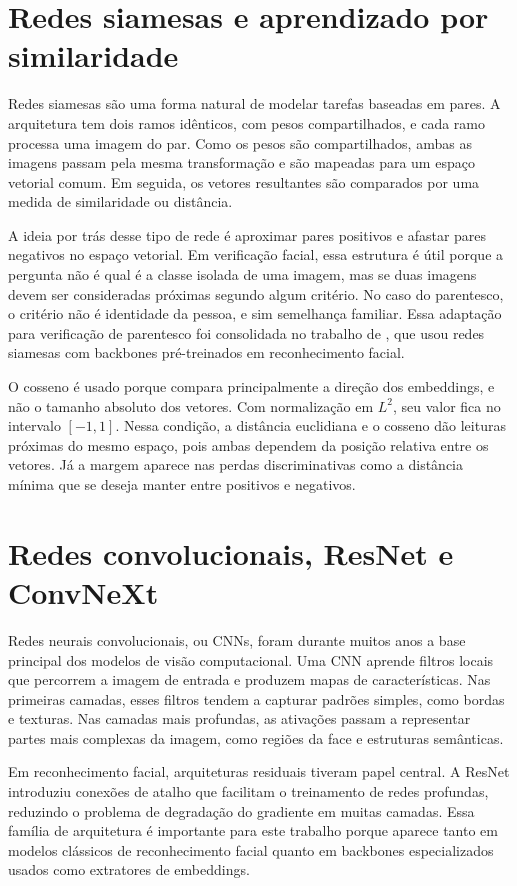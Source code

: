 \section{Redes siamesas e aprendizado por similaridade}

Redes siamesas são uma forma natural de modelar tarefas baseadas em pares. A arquitetura tem dois ramos idênticos, com pesos compartilhados, e cada ramo processa uma imagem do par. Como os pesos são compartilhados, ambas as imagens passam pela mesma transformação e são mapeadas para um espaço vetorial comum. Em seguida, os vetores resultantes são comparados por uma medida de similaridade ou distância.

A ideia por trás desse tipo de rede é aproximar pares positivos e afastar pares negativos no espaço vetorial. Em verificação facial, essa estrutura é útil porque a pergunta não é qual é a classe isolada de uma imagem, mas se duas imagens devem ser consideradas próximas segundo algum critério. No caso do parentesco, o critério não é identidade da pessoa, e sim semelhança familiar. Essa adaptação para verificação de parentesco foi consolidada no trabalho de , que usou redes siamesas com backbones pré-treinados em reconhecimento facial.

O cosseno é usado porque compara principalmente a direção dos embeddings, e não o tamanho absoluto dos vetores. Com normalização em $L^2$, seu valor fica no intervalo $[-1, 1]$. Nessa condição, a distância euclidiana e o cosseno dão leituras próximas do mesmo espaço, pois ambas dependem da posição relativa entre os vetores. Já a margem aparece nas perdas discriminativas como a distância mínima que se deseja manter entre positivos e negativos.

\section{Redes convolucionais, ResNet e ConvNeXt}

Redes neurais convolucionais, ou CNNs, foram durante muitos anos a base principal dos modelos de visão computacional. Uma CNN aprende filtros locais que percorrem a imagem de entrada e produzem mapas de características. Nas primeiras camadas, esses filtros tendem a capturar padrões simples, como bordas e texturas. Nas camadas mais profundas, as ativações passam a representar partes mais complexas da imagem, como regiões da face e estruturas semânticas.

Em reconhecimento facial, arquiteturas residuais tiveram papel central. A ResNet \cite{he2016deep}
introduziu conexões de atalho que facilitam o treinamento de redes profundas, reduzindo o problema de degradação do gradiente em muitas camadas. Essa família de arquitetura é importante para este trabalho porque aparece tanto em modelos clássicos de reconhecimento facial quanto em backbones especializados usados como extratores de embeddings.

